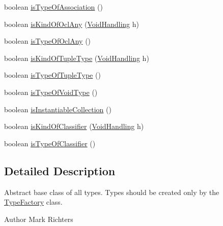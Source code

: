\begin{DoxyCompactItemize}
\item 
boolean \hyperlink{classorg_1_1tzi_1_1use_1_1uml_1_1ocl_1_1type_1_1_type_impl_ae88f2b6b8fcb6aa270e456e702d17034}{is\-Type\-Of\-Association} ()
\item 
boolean \hyperlink{classorg_1_1tzi_1_1use_1_1uml_1_1ocl_1_1type_1_1_type_impl_a4ddb3dcefecbcb1796b981574feff6cd}{is\-Kind\-Of\-Ocl\-Any} (\hyperlink{enumorg_1_1tzi_1_1use_1_1uml_1_1ocl_1_1type_1_1_type_1_1_void_handling}{Void\-Handling} h)
\item 
boolean \hyperlink{classorg_1_1tzi_1_1use_1_1uml_1_1ocl_1_1type_1_1_type_impl_a6486e594f19c0e795cb19b0740b771dc}{is\-Type\-Of\-Ocl\-Any} ()
\item 
boolean \hyperlink{classorg_1_1tzi_1_1use_1_1uml_1_1ocl_1_1type_1_1_type_impl_a4a4089b1839df6731d06bf809c074582}{is\-Kind\-Of\-Tuple\-Type} (\hyperlink{enumorg_1_1tzi_1_1use_1_1uml_1_1ocl_1_1type_1_1_type_1_1_void_handling}{Void\-Handling} h)
\item 
boolean \hyperlink{classorg_1_1tzi_1_1use_1_1uml_1_1ocl_1_1type_1_1_type_impl_a0b9349331f6e4cc1514d4c813b9d93be}{is\-Type\-Of\-Tuple\-Type} ()
\item 
boolean \hyperlink{classorg_1_1tzi_1_1use_1_1uml_1_1ocl_1_1type_1_1_type_impl_af32bc0fd5a5bbdf8b27159a7be493c8a}{is\-Type\-Of\-Void\-Type} ()
\item 
boolean \hyperlink{classorg_1_1tzi_1_1use_1_1uml_1_1ocl_1_1type_1_1_type_impl_a1eadf53964a7d948a523bed0c6e3f23d}{is\-Instantiable\-Collection} ()
\item 
boolean \hyperlink{classorg_1_1tzi_1_1use_1_1uml_1_1ocl_1_1type_1_1_type_impl_a505d674fe2861619df5a25ebc4ab3f4d}{is\-Kind\-Of\-Classifier} (\hyperlink{enumorg_1_1tzi_1_1use_1_1uml_1_1ocl_1_1type_1_1_type_1_1_void_handling}{Void\-Handling} h)
\item 
boolean \hyperlink{classorg_1_1tzi_1_1use_1_1uml_1_1ocl_1_1type_1_1_type_impl_a5d58f78fcf91f091b1f6bd85377fc093}{is\-Type\-Of\-Classifier} ()
\end{DoxyCompactItemize}


\subsection{Detailed Description}
Abstract base class of all types. Types should be created only by the \hyperlink{classorg_1_1tzi_1_1use_1_1uml_1_1ocl_1_1type_1_1_type_factory}{Type\-Factory} class.

\begin{DoxyAuthor}{Author}
Mark Richters 
\end{DoxyAuthor}


